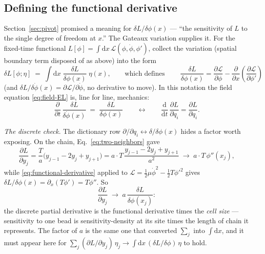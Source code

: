 \documentclass[11pt]{article}
\theoremstyle{plain}
\theoremstyle{definition}
\theoremstyle{remark}
\newcommand{\dd}{\mathrm{d}}
\newcommand{\pd}[2]{\frac{\partial #1}{\partial #2}}
\newcommand{\tot}[2]{\frac{\dd #1}{\dd #2}}
\begin{document}
\subsection{Defining the functional derivative}
\label{sec:functional-derivative}

Section~\ref{sec:pivot} promised a meaning for
$\delta L/\delta\phi(x)$ --- ``the sensitivity of $L$ to the single
degree of freedom at $x$.'' The Gateaux variation supplies it. For the
fixed-time functional $L[\phi] = \int\dd x\,
\mathcal L(\phi, \dot\phi, \phi')$, collect the variation (spatial
boundary term disposed of as above) into the form
\begin{equation}
  \delta L[\phi;\eta]
  \;=\; \int \dd x\;
  \frac{\delta L}{\delta \phi(x)}\;\eta(x),
  \qquad\text{which defines}\qquad
  \boxed{\;
  \frac{\delta L}{\delta \phi(x)}
  = \pd{\mathcal L}{\phi}
  - \pd{}{x}\!\left(\pd{\mathcal L}{\phi'}\right)
  \;}
  \label{eq:functional-derivative}
\end{equation}
(and $\delta L/\delta\dot\phi(x) = \partial\mathcal L/\partial\dot\phi$,
no derivative to move). In this notation the field equation
\eqref{eq:field-EL} is, line for line, mechanics:
\begin{equation}
  \pd{}{t}\,\frac{\delta L}{\delta\dot\phi(x)}
  \;=\;
  \frac{\delta L}{\delta\phi(x)}
  \qquad\longleftrightarrow\qquad
  \tot{}{t}\,\pd{L}{\dot q_i} = \pd{L}{q_i}.
\end{equation}

\emph{The discrete check.} The dictionary row
$\partial/\partial q_i \leftrightarrow \delta/\delta\phi(x)$ hides a
factor worth exposing. On the chain, Eq.~\eqref{eq:two-neighbors} gave
\begin{equation}
  \pd{L}{y_j}
  = \frac{T}{a}\bigl(y_{j-1} - 2y_j + y_{j+1}\bigr)
  = a \cdot T\,\frac{y_{j-1} - 2y_j + y_{j+1}}{a^2}
  \;\longrightarrow\;
  a\cdot T\,\phi''(x_j),
\end{equation}
while \eqref{eq:functional-derivative} applied to
$\mathcal L = \tfrac12\mu\dot\phi^2 - \tfrac12 T\phi'^2$ gives
$\delta L/\delta\phi(x) = \partial_x(T\phi') = T\phi''$. So
\begin{equation}
  \pd{L}{y_j} \;\longrightarrow\; a\,
  \frac{\delta L}{\delta\phi(x_j)} :
\end{equation}
the discrete partial derivative is the functional derivative times the
\emph{cell size} --- sensitivity to one bead is sensitivity-density at
its site times the length of chain it represents. The factor of $a$ is
the same one that converted $\sum_j$ into $\int\dd x$, and it must
appear here for
$\sum_j (\partial L/\partial y_j)\,\eta_j \to
\int\dd x\,(\delta L/\delta\phi)\,\eta$ to hold.
\end{document}
